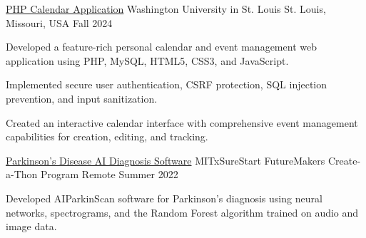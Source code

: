 \documentclass[10pt, letterpaper]{article}
\begin{document}
\begin{projectentry}
  {\href{https://github.com/agopalareddy/CSE503S_PHP_Calendar_App}{PHP Calendar Application}} %
  {Washington University in St. Louis} %
  {St. Louis, Missouri, USA} %
  {Fall 2024} %
  \item Developed a feature-rich personal calendar and event management web application using PHP, MySQL, HTML5, CSS3, and JavaScript.
  \item Implemented secure user authentication, CSRF protection, SQL injection prevention, and input sanitization.
  \item Created an interactive calendar interface with comprehensive event management capabilities for creation, editing, and tracking.
\end{projectentry}

\begin{projectentry}
  {\href{https://github.com/agopalareddy/AIPS}{Parkinson's Disease AI Diagnosis Software}} %
  {MITxSureStart FutureMakers Create-a-Thon Program} %
  {Remote} %
  {Summer 2022} %
  \item Developed AIParkinScan software for Parkinson's diagnosis using neural networks, spectrograms, and the Random Forest algorithm trained on audio and image data.
\end{projectentry}

\end{document}
